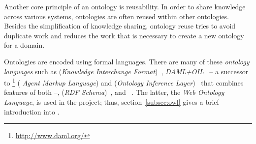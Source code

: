 \vspace{1em}

Another core principle of an ontology is reusability\cite{reuse1,reuse2}. In order to share knowledge across various systems, ontologies are often reused within other ontologies. Besides the simplification of knowledge sharing, ontology reuse tries to avoid duplicate work and reduces the work that is necessary to create a new ontology for a domain.

\vspace{1em}

Ontologies are encoded using formal languages. There are many of these \emph{ontology languages} such as  (\emph{Knowledge Interchange Format})~\cite{KIFReference}, \emph{DAML+OIL}~\cite{DAML+OIL} -- a successor to \footnote{\href{http://www.daml.org/}{http://www.daml.org/}} (\emph{ Agent Markup Language}) and  (\emph{Ontology Inference Layer})~\cite{OIL} that combines features of both --,  (\emph{RDF Schema})~\cite{RDFS}, and ~\cite{OWL}. The latter, the \emph{Web Ontology Language}, is used in the \thinkhome project; thus, section~\ref{subsec:owl} gives a brief introduction into .

